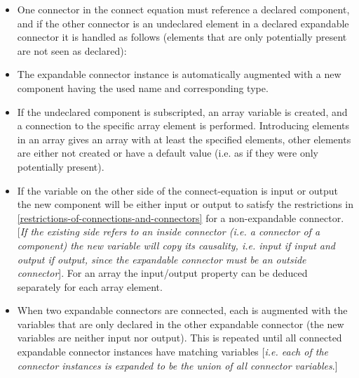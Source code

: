 \documentclass[10pt,a4paper]{report}
\begin{document}
\begin{itemize}
\item
  One connector in the connect equation must reference a declared
  component, and if the other connector is an undeclared element in a
  declared expandable connector it is handled as follows (elements that
  are only potentially present are not seen as declared):
\item
  The expandable connector instance is automatically augmented with a
  new component having the used name and corresponding type.
\item
  If the undeclared component is subscripted, an array variable is
  created, and a connection to the specific array element is performed.
  Introducing elements in an array gives an array with at least the
  specified elements, other elements are either not created or have a
  default value (i.e. as if they were only potentially present).
\item
  If the variable on the other side of the connect-equation is input or
  output the new component will be either input or output to satisfy the
  restrictions in \ref{restrictions-of-connections-and-connectors} for a non-expandable connector.
  {[}\emph{If the existing side refers to an inside connector (i.e. a
  connector of a component) the new variable will copy its causality,
  i.e. input if input and output if output, since the expandable
  connector must be an outside connector}{]}. For an array the
  input/output property can be deduced separately for each array
  element.
\item
  When two expandable connectors are connected, each is augmented with
  the variables that are only declared in the other expandable connector
  (the new variables are neither input nor output). This is repeated
  until all connected expandable connector instances have matching
  variables {[}\emph{i.e. each of the connector instances is expanded to
  be the union of all connector variables}.{]}
\end{itemize}
\end{document}
